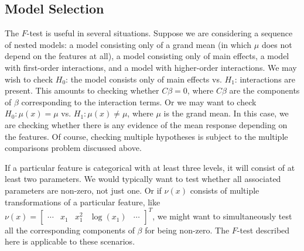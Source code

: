 \documentclass[12pt]{article}
\begin{document}
\subsection{Model Selection}
The $F$-test is useful in several situations. Suppose we are considering a sequence of nested models: a model consisting only of a grand mean (in which $\mu$ does not depend on the features at all), a model consisting only of main effects, a model with first-order interactions, and a model with higher-order interactions. We may wish to check $H_0$: the model consists only of main effects vs. $H_1$: interactions are present. This amounts to checking whether $C \beta = 0$, where $C \beta$ are the components of $\beta$ corresponding to the interaction terms. Or we may want to check $H_0: \mu(x) = \mu$ vs. $H_1: \mu(x) \neq \mu$, where $\mu$ is the grand mean. In this case, we are checking whether there is any evidence of the mean response depending on the features. Of course, checking multiple hypotheses is subject to the multiple comparisons problem discussed above.

If a particular feature is categorical with at least three levels, it will consist of at least two parameters. We would typically want to test whether all associated parameters are non-zero, not just one. Or if $\nu(x)$ consists of multiple transformations of a particular feature, like $\nu(x) = \begin{bmatrix} \cdots & x_1 & x_1^2 & \log(x_1) & \cdots \end{bmatrix}^T$, we might want to simultaneously test all the corresponding components of $\beta$ for being non-zero. The $F$-test described here is applicable to these scenarios.
\end{document}
